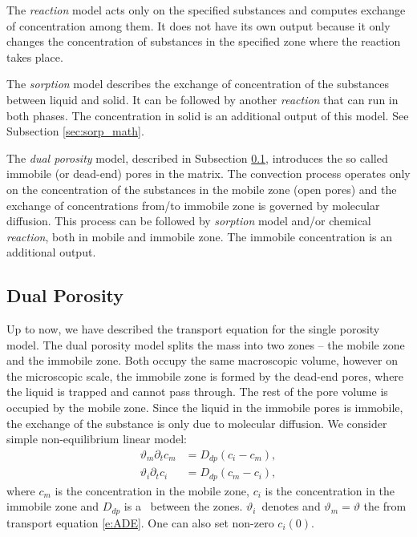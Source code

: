 The \emph{reaction} model acts only on the specified substances and computes exchange of concentration 
among them. It does not have its own output because it only changes the concentration of substances 
in the specified zone where the reaction takes place.

The \emph{sorption} model describes the exchange of concentration of the substances between liquid and solid. It can be
followed by another \emph{reaction} that can run in both phases. The concentration in solid is an additional output 
of this model. See Subsection \ref{sec:sorp_math}.


The \emph{dual porosity} model, described in Subsection \ref{sec:dual_porosity}, introduces the so called immobile (or dead-end) pores in the matrix. 
The convection process operates only on the concentration of the substances in the mobile zone (open pores) 
and the exchange of concentrations from/to immobile zone is governed by molecular diffusion. This process can be followed by 
\emph{sorption} model and/or chemical \emph{reaction}, both in mobile and immobile zone. The immobile concentration is an
additional output.


\subsection{Dual Porosity} 
\label{sec:dual_porosity}

Up to now, we have described the transport equation for the single porosity model. The dual porosity model splits the mass into 
two zones -- the mobile zone and the immobile zone. Both occupy the same macroscopic volume, however on the microscopic scale, 
the immobile zone is formed by the dead-end pores, where the liquid is trapped and cannot pass through. The rest of the pore volume 
is occupied by the mobile zone. Since the liquid in the immobile pores is immobile, the exchange of the substance is only due 
to molecular diffusion. We consider simple non-equilibrium linear model:
\begin{subequations}
\label{eq:odes_dual_por}
\begin{align}
    \vartheta_m \partial_t c_m &= D_{dp} ( c_i - c_m), \label{eqn:dual_porosity_ode1}\\
    \vartheta_i \partial_t c_i &= D_{dp} ( c_m - c_i), \label{eqn:dual_porosity_ode2}
\end{align}
\end{subequations}
where $c_m$ is the concentration in the mobile zone, $c_i$ is the concentration in the immobile zone and
$D_{dp}$ is a~ between the zones.
$\vartheta_i$~denotes  and 
$\vartheta_m = \vartheta$ the  from 
transport equation \eqref{e:ADE}. One can also set non-zero  $c_i(0)$.

